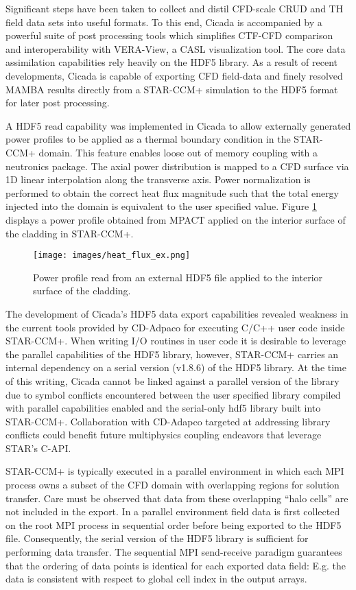Significant steps have been taken to collect and distil CFD-scale CRUD and TH field data sets into useful formats.  To this end, Cicada is accompanied by a powerful suite of post processing tools which simplifies CTF-CFD comparison and interoperability with VERA-View, a CASL visualization tool. The core data assimilation capabilities rely heavily on the HDF5 library.  As a result of recent developments, Cicada is capable of exporting CFD field-data and finely resolved MAMBA results directly from a STAR-CCM+ simulation to the HDF5 format for later post processing.  

A HDF5 read capability was implemented in Cicada to allow externally generated power profiles to be applied as a thermal boundary condition in the STAR-CCM+ domain.  This feature enables loose out of memory coupling with a neutronics package. 
The axial power distribution is mapped to a CFD surface via 1D linear interpolation along the transverse axis.  Power normalization is performed to obtain the correct heat flux magnitude such that the total energy injected into the domain is equivalent to the user specified value.   Figure \ref{fig:heat_flux_ex} displays a power profile obtained from MPACT applied on the interior surface of the cladding in STAR-CCM+.

\begin{figure}[hbtp]
\centering
\texttt{[image: images/heat\_flux\_ex.png]}
\caption{Power profile read from an external HDF5 file applied to the interior surface of the cladding.}
\label{fig:heat_flux_ex}
\end{figure}

The development of Cicada's HDF5 data export capabilities revealed weakness in the current tools provided by CD-Adpaco for executing C/C++ user code inside STAR-CCM+.  When writing I/O routines in user code it is desirable to leverage the parallel capabilities of the HDF5 library, however, STAR-CCM+ carries an internal dependency on a serial version (v1.8.6) of the HDF5 library.  At the time of this writing, Cicada cannot be linked against a parallel version of the library due to symbol conflicts encountered between the user specified library compiled with parallel capabilities enabled and the serial-only hdf5 library built into STAR-CCM+.
Collaboration with CD-Adapco targeted at addressing library conflicts could benefit future multiphysics coupling endeavors that leverage STAR's C-API.

STAR-CCM+ is typically executed in a parallel environment in which each MPI process owns a subset of the CFD domain with overlapping regions for solution transfer.  Care must be observed that data from these overlapping ``halo cells'' are not included in the export.  In a parallel environment field data is first collected on the root MPI process in sequential order before being exported to the HDF5 file.  Consequently, the serial version of the HDF5 library is sufficient for performing data transfer.  The sequential MPI send-receive paradigm guarantees that the ordering of data points is identical for each exported data field: E.g. the data is consistent with respect to global cell index in the output arrays.   

